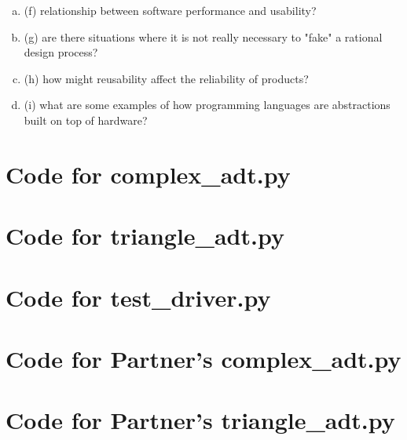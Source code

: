 \documentclass[12pt]{article}
\begin{document}
\begin{enumerate}[(a)]
 \item (f) relationship between software performance and usability?

 \item (g) are there situations where it is not really necessary to "fake" a rational design process?

 \item (h) how might reusability affect the reliability of products?

 \item (i) what are some examples of how programming languages are abstractions built on top of hardware?

\end{enumerate}

\newpage

\lstset{language=Python, basicstyle=\tiny, breaklines=true, showspaces=false,
  showstringspaces=false, breakatwhitespace=true}

\def\thesection{\Alph{section}}

\section{Code for complex\_adt.py}

\noindent 

\newpage

\section{Code for triangle\_adt.py}

\noindent 

\newpage

\section{Code for test\_driver.py}

\noindent 

\newpage

\section{Code for Partner's complex\_adt.py}

\noindent 

\section{Code for Partner's triangle\_adt.py}

\noindent 
\end{document}

